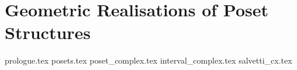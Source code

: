 \documentclass[class=article, crop=false]{standalone}
\begin{document}
\section{Geometric Realisations of Poset Structures}
{prologue.tex}
{posets.tex}
{poset_complex.tex}
{interval_complex.tex}
{salvetti_cx.tex}
\end{document}
